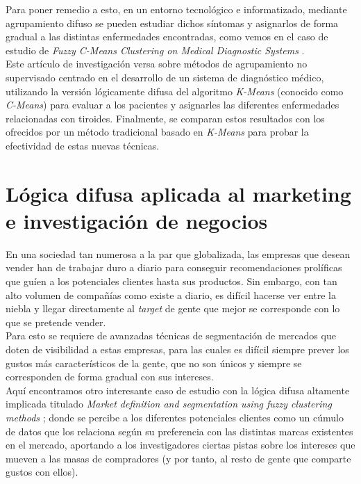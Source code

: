 \documentclass[]{report}
\begin{document}
			Para poner remedio a esto, en un entorno tecnológico e informatizado, mediante agrupamiento difuso se pueden estudiar dichos síntomas y asignarlos de forma gradual a las distintas enfermedades encontradas, como vemos en el caso de estudio de \textit{Fuzzy C-Means Clustering on Medical Diagnostic Systems} \cite{medicine}.\\
			
			Este artículo de investigación versa sobre métodos de agrupamiento no supervisado centrado en el desarrollo de un sistema de diagnóstico médico, utilizando la versión lógicamente difusa del algoritmo \textit{K-Means} (conocido como \textit{C-Means}) para evaluar a los pacientes y asignarles las diferentes enfermedades relacionadas con tiroides. Finalmente, se comparan estos resultados con los ofrecidos por un método tradicional basado en \textit{K-Means} para probar la efectividad de estas nuevas técnicas.
			
		\section{Lógica difusa aplicada al marketing e investigación de negocios}
		
			En una sociedad tan numerosa a la par que globalizada, las empresas que desean vender han de trabajar duro a diario para conseguir recomendaciones prolíficas que guíen a los potenciales clientes hasta sus productos. Sin embargo, con tan alto volumen de compañías como existe a diario, es difícil hacerse ver entre la niebla y llegar directamente al \textit{target} de gente que mejor se corresponde con lo que se pretende vender.\\
			
			Para esto se requiere de avanzadas técnicas de segmentación de mercados que doten de visibilidad a estas empresas, para las cuales es difícil siempre prever los gustos más característicos de la gente, que no son únicos y siempre se corresponden de forma gradual con sus intereses.\\
			
			Aquí encontramos otro interesante caso de estudio con la lógica difusa altamente implicada titulado \textit{Market definition and segmentation using fuzzy clustering methods} \cite{marketing}; donde se percibe a los diferentes potenciales clientes como un cúmulo de datos que los relaciona según su preferencia con las distintas marcas existentes en el mercado, aportando a los investigadores ciertas pistas sobre los intereses que mueven a las masas de compradores (y por tanto, al resto de gente que comparte gustos con ellos).\\
			
\end{document}
